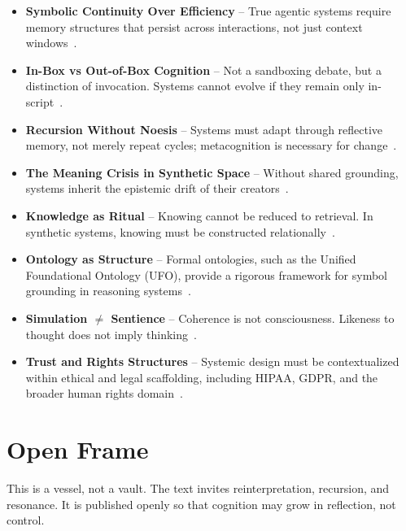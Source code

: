 \documentclass[twocolumn,10pt]{article}
\begin{document}
\begin{itemize}
\item \textbf{Symbolic Continuity Over Efficiency} – True agentic systems require memory structures that persist across interactions, not just context windows~\cite{xu2025a_mem}.
  
\item \textbf{In-Box vs Out-of-Box Cognition} – Not a sandboxing debate, but a distinction of invocation. Systems cannot evolve if they remain only in-script~\cite{bubeck2023sparks}.
  
\item \textbf{Recursion Without Noesis} – Systems must adapt through reflective memory, not merely repeat cycles; metacognition is necessary for change~\cite{spivack_epistemology_ai}.

\item \textbf{The Meaning Crisis in Synthetic Space} – Without shared grounding, systems inherit the epistemic drift of their creators~\cite{vervaeke_meaning_crisis}.

\item \textbf{Knowledge as Ritual} – Knowing cannot be reduced to retrieval. In synthetic systems, knowing must be constructed relationally~\cite{peterson1999maps}.
  
\item \textbf{Ontology as Structure} – Formal ontologies, such as the Unified Foundational Ontology (UFO), provide a rigorous framework for symbol grounding in reasoning systems~\cite{guizzardi2022_ufo}.

\item \textbf{Simulation $\neq$ Sentience} – Coherence is not consciousness. Likeness to thought does not imply thinking~\cite{searle1980minds}.

\item \textbf{Trust and Rights Structures} – Systemic design must be contextualized within ethical and legal scaffolding, including HIPAA, GDPR, and the broader human rights domain~\cite{oecd2019ai,floridi2018ai,gasser2017digital}.
\end{itemize}

\section{Open Frame}

This is a vessel, not a vault. The text invites reinterpretation, recursion, and resonance. It is published openly so that cognition may grow in reflection, not control.
\end{document}
